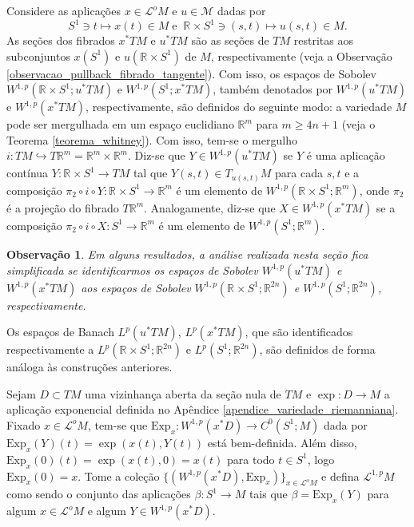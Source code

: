 \documentclass[12pt]{book}
\newtheorem{observacao}[teorema]{Observação}
\newcommand{\caminhosexponenciaisSobolev}{\mathcal{L}^{1,p}M}
\newcommand{\circulo}{S^{1}}
\newcommand{\energiafinitaM}{\mathcal{M}}
\newcommand{\espacoLp}[1]{L^{p}(#1)}
\newcommand{\espacoLpcontradominio}[2]{L^{p}(#1;#2)}
\newcommand{\espacosobolev}[1]{W^{1,p}(#1)}
\newcommand{\espacosobolevcontradominio}[2]{W^{1,p}(#1;#2)}
\newcommand{\espacotangenteponto}[2]{T_{#1}#2}
\newcommand{\Exp}{\text{Exp}}
\newcommand{\pullbackfibradotangente}[2]{#1^{*}T#2}
\newcommand{\pullbackfibradotangenteM}[1]{\pullbackfibradotangente{#1}{M}}
\newcommand{\retacartesianocirculo}{\real{} \times \circulo}
\newcommand{\real}[1]{\mathbb{R}^{#1}}
\newcommand{\lacocontrateis}{\mathcal{L}^{o}M}
\begin{document}
	Considere as aplicações $x\in\lacocontrateis$ e $u \in \energiafinitaM$ dadas por
	$$
	\circulo \ni t \mapsto x(t) \in M\; \text{e}\;\;\retacartesianocirculo \ni (s,t)\mapsto u(s,t) \in M.
	$$ 
	As seções dos fibrados $\pullbackfibradotangenteM{x}$ e $\pullbackfibradotangenteM{u}$ são as seções de $TM$ restritas aos subconjuntos $x(\circulo )$ e  $u(\retacartesianocirculo )$ de $M$, respectivamente (veja a Observação \ref{observacao_pullback_fibrado_tangente}). Com isso, os espaços de Sobolev $\espacosobolevcontradominio{\retacartesianocirculo}{\pullbackfibradotangenteM{u}}$ e $\espacosobolevcontradominio{\circulo}{\pullbackfibradotangenteM{x}}$, também denotados por  $\espacosobolev{\pullbackfibradotangenteM{u}}$ e $\espacosobolev{\pullbackfibradotangenteM{x}}$, respectivamente, são definidos do seguinte modo: a variedade $M$ pode ser mergulhada em um espaço euclidiano $\real{m}$ para $m\geq 4n+1$ (veja o Teorema \ref{teorema_whitney}). Com isso, tem-se o mergulho $i:TM \hookrightarrow T\real{m} = \real{m} \times \real{m}$. Diz-se que $Y\in \espacosobolev{\pullbackfibradotangenteM{u}}$ se $Y$ é uma aplicação contínua $Y:\retacartesianocirculo\to TM$ tal que $Y(s,t)\in \espacotangenteponto{u(s,t)}{M}$ para cada $s,t $ e a 	composição $\pi_{2}\circ i\circ Y:\retacartesianocirculo\to \real{m}$ é um elemento de $\espacosobolevcontradominio{\retacartesianocirculo}{\real{m}}$, onde $\pi_{2}$ é a projeção do fibrado $T\real{m}$. Analogamente, diz-se que $X \in \espacosobolev{\pullbackfibradotangenteM{x}}$ se a composição $\pi_{2}\circ i\circ X:\circulo \to \real{m}$ é um elemento de $\espacosobolevcontradominio{\circulo}{\real{m}}$.
	
	\begin{observacao}
		Em alguns resultados, a análise realizada nesta seção fica simplificada se identificarmos os espaços de Sobolev $\espacosobolev{\pullbackfibradotangenteM{u}}$ e $\espacosobolev{\pullbackfibradotangenteM{x}}$ aos espaços de Sobolev $\espacosobolevcontradominio{\retacartesianocirculo}{\real{2n}}$ e  $\espacosobolevcontradominio{\circulo}{\real{2n}}$, respectivamente.
	\end{observacao}
	
	Os espaços de Banach  $\espacoLp{\pullbackfibradotangenteM{u}}$, $\espacoLp{\pullbackfibradotangenteM{x}}$, que são identificados respectivamente a $\espacoLpcontradominio{\retacartesianocirculo}{\real{2n}}$ e $\espacoLpcontradominio{\circulo}{\real{2n}}$, são definidos de forma análoga às construções anteriores.
	
	Sejam $D \subset TM$ uma vizinhança aberta da seção nula de $TM$ e $\exp:D\to M$ a aplicação exponencial definida no Apêndice \ref{apendice_variedade_riemanniana}.
	Fixado $x\in \lacocontrateis$, tem-se que $\Exp_{x}: \espacosobolev{x^{*}D} \to C^{0}(\circulo;M)$ dada por $\Exp_{x}(Y)(t) = \exp(x(t),Y(t))$ está bem-definida. Além disso, $\Exp_{x}(0)(t) = \exp(x(t),0) = x(t)$ para todo $t\in \circulo$, logo $\Exp_{x}(0)=x$.
	Tome a coleção $\{ (\espacosobolev{x^{*}D}, \Exp_{x}) \}_{x \in \lacocontrateis}$ e defina $\caminhosexponenciaisSobolev$ como sendo o conjunto das aplicações $\beta:\circulo\to M$ tais que $\beta=\Exp_{x}(Y)$ para algum $x\in \lacocontrateis$ e algum $Y \in \espacosobolev{x^{*}D}$.
	
\end{document}
